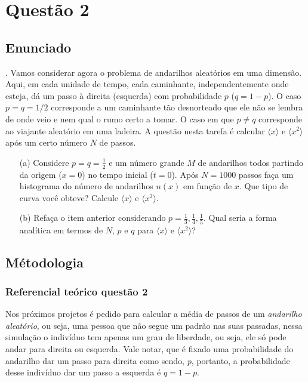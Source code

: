 \chapter*{Questão 2}

\section*{Enunciado}

. Vamos considerar agora o problema de andarilhos aleatórios em uma dimensão. 
Aqui, em cada unidade de tempo, cada caminhante, independentemente onde esteja, 
dá um passo à direita (esquerda) com probabilidade $p$ ($q = 1 - p$). 
O caso $p = q = 1/2$ corresponde a um caminhante tão desnorteado que ele não 
se lembra de onde veio e nem qual o rumo certo a tomar. 
O caso em que $p \neq q$ corresponde ao viajante aleatório em uma ladeira. 
A questão nesta tarefa é calcular $\langle x \rangle$ e $\langle x^2 \rangle$ 
após um certo número $N$ de passos.

\begin{enumerate}
    \item[(a)] Considere $p = q = \tfrac{1}{2}$ e um número grande $M$ de andarilhos 
    todos partindo da origem ($x = 0$) no tempo inicial ($t = 0$). 
    Após $N = 1000$ passos faça um histograma do número de andarilhos $n(x)$ em função de $x$. 
    Que tipo de curva você obteve? Calcule $\langle x \rangle$ e $\langle x^2 \rangle$.

    \item[(b)] Refaça o item anterior considerando $p = \tfrac{1}{3}, \tfrac{1}{4}, \tfrac{1}{5}$. 
    Qual seria a forma analítica em termos de $N$, $p$ e $q$ para 
    $\langle x \rangle$ e $\langle x^2 \rangle$?
\end{enumerate}

\section*{Métodologia}

\subsection*{Referencial teórico questão 2}

Nos próximos projetos é pedido para calcular a média de passos de um \textit{andarilho aleatório}, ou seja, uma pessoa que não segue um padrão nas suas passadas, nessa simulação o indivíduo tem apenas um grau de liberdade, ou seja, ele só pode andar para direita ou esquerda. Vale notar, que é fixado uma probabilidade do andarilho dar um passo para direita como sendo, \textit{p}, portanto, a probabilidade desse indivíduo dar um passo a esquerda é \( q = 1 -p\).

